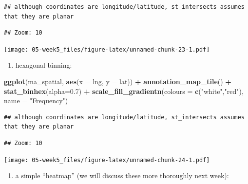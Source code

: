\documentclass[]{book}
\newenvironment{Shaded}{\begin{snugshade}}{\end{snugshade}}
\newcommand{\DataTypeTok}[1]{\textcolor[rgb]{0.13,0.29,0.53}{#1}}
\newcommand{\FloatTok}[1]{\textcolor[rgb]{0.00,0.00,0.81}{#1}}
\newcommand{\KeywordTok}[1]{\textcolor[rgb]{0.13,0.29,0.53}{\textbf{#1}}}
\newcommand{\NormalTok}[1]{#1}
\newcommand{\OperatorTok}[1]{\textcolor[rgb]{0.81,0.36,0.00}{\textbf{#1}}}
\newcommand{\StringTok}[1]{\textcolor[rgb]{0.31,0.60,0.02}{#1}}
\providecommand{\tightlist}{%
  \setlength{\itemsep}{0pt}\setlength{\parskip}{0pt}}
\begin{document}
\begin{verbatim}
## although coordinates are longitude/latitude, st_intersects assumes that they are planar
\end{verbatim}

\begin{verbatim}
## Zoom: 10
\end{verbatim}

\texttt{[image: 05-week5\_files/figure-latex/unnamed-chunk-23-1.pdf]}

\begin{enumerate}
\def\labelenumi{\alph{enumi})}
\setcounter{enumi}{1}
\tightlist
\item
  hexagonal binning:
\end{enumerate}

\begin{Shaded}
\begin{Highlighting}[]
\KeywordTok{ggplot}\NormalTok{(ma_spatial, }\KeywordTok{aes}\NormalTok{(}\DataTypeTok{x =}\NormalTok{ lng, }\DataTypeTok{y =}\NormalTok{ lat)) }\OperatorTok{+}\StringTok{ }
\StringTok{  }\KeywordTok{annotation_map_tile}\NormalTok{() }\OperatorTok{+}\StringTok{ }
\StringTok{  }\KeywordTok{stat_binhex}\NormalTok{(}\DataTypeTok{alpha=}\FloatTok{0.7}\NormalTok{) }\OperatorTok{+}\StringTok{ }
\StringTok{  }\KeywordTok{scale_fill_gradientn}\NormalTok{(}\DataTypeTok{colours =} \KeywordTok{c}\NormalTok{(}\StringTok{"white"}\NormalTok{,}\StringTok{"red"}\NormalTok{), }
                       \DataTypeTok{name =} \StringTok{"Frequency"}\NormalTok{)}
\end{Highlighting}
\end{Shaded}

\begin{verbatim}
## although coordinates are longitude/latitude, st_intersects assumes that they are planar
\end{verbatim}

\begin{verbatim}
## Zoom: 10
\end{verbatim}

\texttt{[image: 05-week5\_files/figure-latex/unnamed-chunk-24-1.pdf]}

\begin{enumerate}
\def\labelenumi{\alph{enumi})}
\setcounter{enumi}{2}
\tightlist
\item
  a simple ``heatmap'' (we will discuss these more thoroughly next week):
\end{enumerate}
\end{document}
